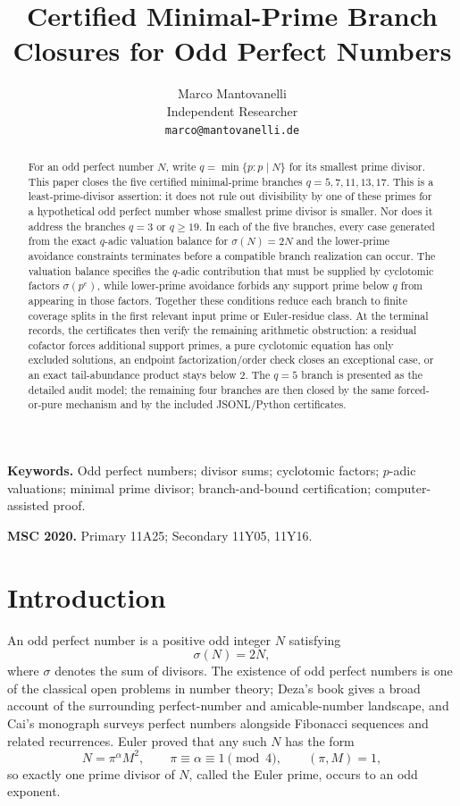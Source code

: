 \documentclass[11pt]{article}
\title{Certified Minimal-Prime Branch Closures for Odd Perfect Numbers}
\author{
Marco Mantovanelli\\
Independent Researcher\\[0.5em]
\texttt{marco@mantovanelli.de}
}
\date{}
\theoremstyle{definition}
\theoremstyle{remark}
\begin{document}
\maketitle

\begin{abstract}
For an odd perfect number \(N\), write
\(q=\min\{p:p\mid N\}\) for its smallest prime divisor.  This paper closes the
five certified minimal-prime branches
\(q=5,7,11,13,17\).  This is a least-prime-divisor assertion: it does not rule
out divisibility by one of these primes for a hypothetical odd perfect number
whose smallest prime divisor is smaller.  Nor does it address the branches
\(q=3\) or \(q\ge19\).  In each of the five branches, every case generated from
the exact \(q\)-adic valuation balance for
\(\sigma(N)=2N\) and the lower-prime avoidance constraints terminates before a
compatible branch realization can occur.  The valuation
balance specifies the \(q\)-adic contribution that must be supplied by
cyclotomic factors \(\sigma(p^e)\), while lower-prime avoidance forbids any
support prime below \(q\) from appearing in those factors.  Together these
conditions reduce each branch to finite coverage splits in the first relevant
input prime or Euler-residue class.  At the terminal records, the certificates
then verify the remaining arithmetic obstruction: a residual cofactor forces
additional support primes, a pure cyclotomic equation has only excluded
solutions, an endpoint factorization/order check closes an exceptional case, or
an exact tail-abundance product stays below \(2\).  The \(q=5\) branch is
presented as the detailed audit model; the remaining four branches are then
closed by the same forced-or-pure mechanism and by the included JSONL/Python
certificates.
\end{abstract}

\noindent\textbf{Keywords.}
Odd perfect numbers; divisor sums; cyclotomic factors; \(p\)-adic valuations;
minimal prime divisor; branch-and-bound certification; computer-assisted proof.

\smallskip

\noindent\textbf{MSC 2020.}
Primary 11A25; Secondary 11Y05, 11Y16.

\section{Introduction}

An odd perfect number is a positive odd integer \(N\) satisfying
\[
  \sigma(N)=2N,
\]
where \(\sigma\) denotes the sum of divisors.  The existence of odd perfect
numbers is one of the classical open problems in number theory; Deza's book
\cite{Deza2022} gives a broad account of the surrounding perfect-number and
amicable-number landscape, and Cai's monograph \cite{Cai2022} surveys perfect
numbers alongside Fibonacci sequences and related recurrences.  Euler proved
that any such \(N\) has the form
\[
  N=\pi^\alpha M^2,\qquad
  \pi\equiv \alpha\equiv1\pmod4,\qquad (\pi,M)=1,
\]
so exactly one prime divisor of \(N\), called the Euler prime, occurs to an odd
exponent.
\end{document}
